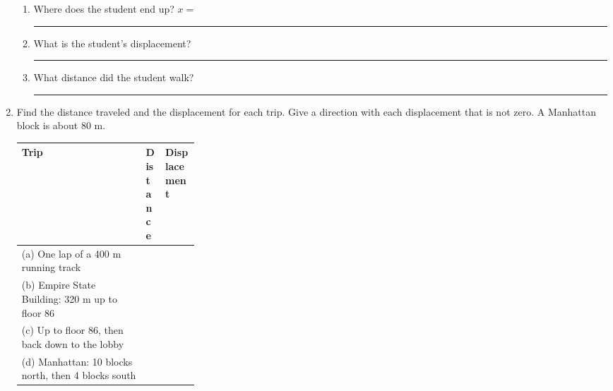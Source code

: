 \documentclass[12pt, twoside]{article}
\begin{document}
\begin{enumerate}[itemsep=0.5cm]
  \begin{center}
  \end{center}

  \begin{enumerate}[itemsep=0.5cm]
    \item Where does the student end up? \hfill $x = $ \rule{2.5cm}{0.4pt}
    \item What is the student's displacement? \hfill \rule{3.5cm}{0.4pt}
    \item What distance did the student walk? \hfill \rule{3.5cm}{0.4pt}
  \end{enumerate}

\item Find the distance traveled and the displacement for each trip. Give a direction
  with each displacement that is not zero. A Manhattan block is about 80 m.

  \vspace{0.15cm}
  \renewcommand{\arraystretch}{1.75}
  \begin{tabular}{| l | p{0.115\linewidth} | p{0.19\linewidth} |}
    \hline
    \textbf{Trip} & \textbf{Distance} & \textbf{Displacement} \\ \hline
    (a) One lap of a 400 m running track & & \\ \hline
    (b) Empire State Building: 320 m up to floor 86 & & \\ \hline
    (c) Up to floor 86, then back down to the lobby & & \\ \hline
    (d) Manhattan: 10 blocks north, then 4 blocks south & & \\ \hline
  \end{tabular}


\end{enumerate}
\end{document}
